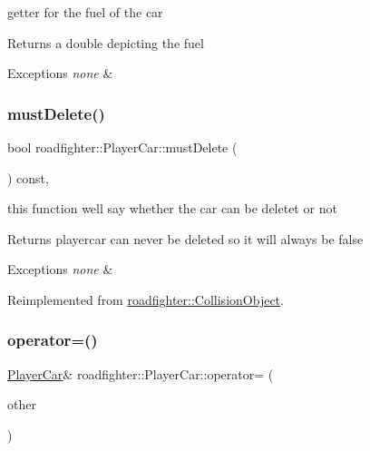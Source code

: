 getter for the fuel of the car \begin{DoxyReturn}{Returns}
a double depicting the fuel 
\end{DoxyReturn}

\begin{DoxyExceptions}{Exceptions}
{\em none} & \\
\hline
\end{DoxyExceptions}
\mbox{\label{classroadfighter_1_1PlayerCar_aaf4dc181a4d21e544aecd7a8e538cfd6}} 
\subsubsection{\texorpdfstring{must\+Delete()}{mustDelete()}}
{\footnotesize\ttfamily bool roadfighter\+::\+Player\+Car\+::must\+Delete (\begin{DoxyParamCaption}{ }\end{DoxyParamCaption}) const\hspace{0.3cm}{\ttfamily [override]}, {\ttfamily [virtual]}}

this function well say whether the car can be deletet or not \begin{DoxyReturn}{Returns}
playercar can never be deleted so it will always be false 
\end{DoxyReturn}

\begin{DoxyExceptions}{Exceptions}
{\em none} & \\
\hline
\end{DoxyExceptions}


Reimplemented from \hyperlink{classroadfighter_1_1CollisionObject_a738071cd7b1b8cd4c8d455b5e552bd4c}{roadfighter\+::\+Collision\+Object}.

\mbox{\label{classroadfighter_1_1PlayerCar_a1913e3231449aa67ad450ac15267086b}} 
\subsubsection{\texorpdfstring{operator=()}{operator=()}\hspace{0.1cm}{\footnotesize\ttfamily [1/2]}}
{\footnotesize\ttfamily \hyperlink{classroadfighter_1_1PlayerCar}{Player\+Car}\& roadfighter\+::\+Player\+Car\+::operator= (\begin{DoxyParamCaption}\item[{const \hyperlink{classroadfighter_1_1PlayerCar}{Player\+Car} \&}]{other }\end{DoxyParamCaption})\hspace{0.3cm}{\ttfamily [default]}}


